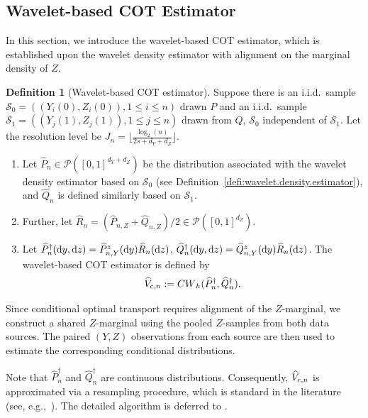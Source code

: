 \documentclass{article}
\theoremstyle{plain}
\theoremstyle{definition}
\newtheorem{definition}{Definition}[section]
\def\PP{P}
\def\QQ{Q}
\def\calP{\mathcal{P}}
\def\calS{\mathcal{S}}
\newcommand{\cc}{\textup{c}}
\theoremstyle{plain}
\newcommand{\diff}{{\rm d}}
\def\calP{\mathcal{P}}
\def\calS{\mathcal{S}}
\newcommand{\Cwass}{{CW}}
\begin{document}
\subsection{Wavelet-based COT Estimator}\label{sec:estimator_form}
In this section, we introduce the wavelet-based COT estimator, which is established upon the wavelet density estimator with alignment on the marginal density of $Z$.
\begin{definition}[Wavelet-based COT estimator]\label{defi:wavelet_estimator}
Suppose there is an i.i.d.~sample $\calS_0 = ((Y_i(0), Z_i(0)), 1\leq i \leq n)$ drawn $P$ and an i.i.d.~sample $\calS_1 = ((Y_j(1), Z_j(1)), 1\leq j \leq n)$ drawn from $Q$, $\calS_0 $ independent of $\calS_1$. Let the resolution level be $J_n = \lfloor \frac{\log_2(n)}{2s + d_Y + d_Z}\rfloor$.
    \begin{enumerate}[label=(\roman*)]
        \item Let $\widehat P_n \in \calP([0,1]^{d_Y+d_Z})$ be the distribution associated with the wavelet density estimator based on $\calS_0$ (see Definition~\ref{defi:wavelet.density.estimator}), and $\widehat Q_n$ is defined similarly based on $\calS_1$.
        \item Further, let $\widehat R_{n} = (\widehat \PP_{n,Z} + \widehat \QQ_{n,Z})/2 \in \calP([0,1]^{d_Z})$. 

        \item Let $\widehat P_n^{\dagger}(\diff y, \diff z) = {\widehat \PP_{n, Y}^z}(\diff y) \widehat R_{n}(\diff z)$, $\widehat Q_n^{\dagger}(\diff y, \diff z) = {\widehat \QQ_{n, Y}^z}(\diff y) \widehat R_{n}(\diff z)$. The wavelet-based COT estimator is defined by
        \[
            \widehat V_{\cc, n} := \Cwass_h(\widehat P_n^{\dagger}, \widehat Q_n^{\dagger}).
        \]
    \end{enumerate}
\end{definition}
Since conditional optimal transport requires alignment of the $Z$-marginal, we construct a shared $Z$-marginal using the pooled $Z$-samples from both data sources. The paired $(Y,Z)$ observations from each source are then used to estimate the corresponding conditional distributions.

Note that $\widehat P_n^{\dagger}$ and $\widehat Q_n^{\dagger}$ are continuous distributions. Consequently, $\widehat V_{\cc,n}$ is approximated via a resampling procedure, which is standard in the literature (see, e.g.,~\parencite{weed2019estimation, deb2021rates}). The detailed algorithm is deferred to .
\end{document}
